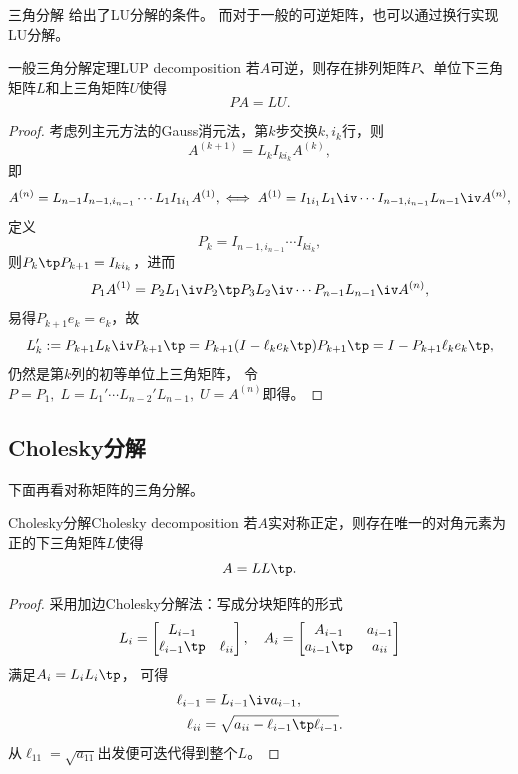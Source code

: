 三角分解 给出了LU分解的条件。
而对于一般的可逆矩阵，也可以通过换行实现LU分解。

\begin{theorem}
    {一般三角分解定理}{LUP decomposition}
    若$A$可逆，则存在排列矩阵$P$、单位下三角矩阵$L$和上三角矩阵$U$使得
    \begin{equation}
        PA=LU.
    \end{equation}
\end{theorem}

\begin{proof}
    考虑列主元方法的Gauss消元法，第$k$步交换$k,i_k$行，则
    \[
        A^{(k+1)}=L_kI_{ki_k}A^{(k)},
    \]
    即
    \[
        A^{(n)}=L_{n-1}I_{n-1,i_{n-1}}\cdots L_1I_{1i_1}A^{(1)},
        \iff
        A^{(1)}=I_{1i_1}L_1\iv\cdots I_{n-1,i_{n-1}}L_{n-1}\iv A^{(n)},
    \]
    定义
    \[
        P_k=I_{n-1,i_{n-1}}\cdots I_{ki_k},
    \]
    则$P_k\tp P_{k+1}=I_{ki_k}$，进而
    \[
        P_1A^{(1)}=P_2L_1\iv P_2\tp P_3L_2\iv\cdots P_{n-1}L_{n-1}\iv A^{(n)},
    \]
    易得$P_{k+1}e_k=e_k$，故
    \[
        L_k':=P_{k+1}L_k\iv P_{k+1}\tp=P_{k+1}(I-\ell_ke_k\tp)P_{k+1}\tp=I-P_{k+1}\ell_ke_k\tp,
    \]
    仍然是第$k$列的初等单位上三角矩阵，
    令$P=P_1,\;L=L_1'\cdots L_{n-2}'L_{n-1},\;U=A^{(n)}$即得。
\end{proof}

\subsection{Cholesky分解}

下面再看对称矩阵的三角分解。

\begin{theorem}
    {Cholesky分解}{Cholesky decomposition}
    若$A$实对称正定，则存在唯一的对角元素为正的下三角矩阵$L$使得
    \begin{equation}
        A=LL\tp.
    \end{equation}
\end{theorem}

\begin{proof}
    采用加边Cholesky分解法：写成分块矩阵的形式
    \[
        L_i=\begin{bmatrix}
            L_{i-1}\\\ell_{i-1}\tp&\ell_{ii}
        \end{bmatrix},\quad A_i=\begin{bmatrix}
            A_{i-1}&a_{i-1}\\ a_{i-1}\tp&a_{ii}
        \end{bmatrix}
    \]
    满足$A_i=L_iL_i\tp$，
    可得 
    \begin{subequations}
        \begin{align}
            \ell_{i-1}&=L_{i-1}\iv a_{i-1},\\
            \ell_{ii}&=\sqrt{a_{ii}-\ell_{i-1}\tp\ell_{i-1}}.
        \end{align}
    \end{subequations}
    从$\ell_{11}=\sqrt{a_{11}}$出发便可迭代得到整个$L$。
\end{proof}

